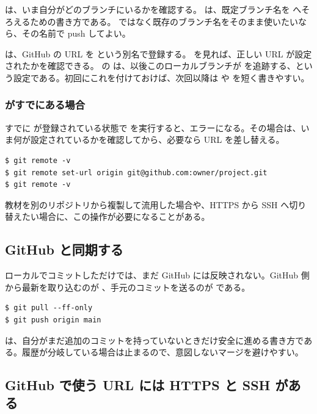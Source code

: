  は、いま自分がどのブランチにいるかを確認する。 は、既定ブランチ名を  へそろえるための書き方である。 ではなく既存のブランチ名をそのまま使いたいなら、その名前で push してよい。

 は、GitHub の URL を  という別名で登録する。 を見れば、正しい URL が設定されたかを確認できる。 の  は、以後このローカルブランチが  を追跡する、という設定である。初回にこれを付けておけば、次回以降は  や  を短く書きやすい。

\subsubsection{ がすでにある場合}

すでに  が登録されている状態で  を実行すると、エラーになる。その場合は、いま何が設定されているかを確認してから、必要なら URL を差し替える。

\begin{lstlisting}[numbers=none, xleftmargin=2\zw]
$ git remote -v
$ git remote set-url origin git@github.com:owner/project.git
$ git remote -v
\end{lstlisting}

教材を別のリポジトリから複製して流用した場合や、HTTPS から SSH へ切り替えたい場合に、この操作が必要になることがある。

\subsection{GitHub と同期する}

ローカルでコミットしただけでは、まだ GitHub には反映されない。GitHub 側から最新を取り込むのが 、手元のコミットを送るのが  である。

\begin{lstlisting}[numbers=none, xleftmargin=2\zw]
$ git pull --ff-only
$ git push origin main
\end{lstlisting}

 は、自分がまだ追加のコミットを持っていないときだけ安全に進める書き方である。履歴が分岐している場合は止まるので、意図しないマージを避けやすい。

\subsection{GitHub で使う URL には HTTPS と SSH がある}

